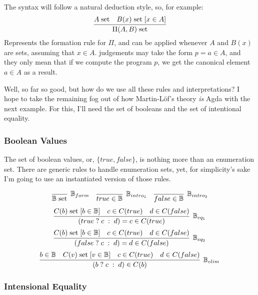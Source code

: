 \newcommand{\isset}[1]{#1 \; \text{set}}
\newcommand{\withhip}[2]{#2 \; [ #1 ] }
\newcommand{\BB}{\mathbb{B}}
\newcommand{\ite}[3]{(#1 \; ? \; #2 \; : \; #3)}
The syntax will follow a natural deduction style, so, for example: 
\[
  \infer{\isset{\Pi(A , B)}}{\isset{A} & \withhip{x \in A}{\isset{B(x)}}}
\]
Represents the formation rule for $\Pi$, and can be applied whenever $A$ and $B(x)$ are sets,
assuming that $x \in A$. judgements may take the form $p = a \in A$, and they only mean 
that if we compute the program $p$, we get the canonical element $a \in A$ as a result.

Well, so far so good, but how do we use all these rules and interpretations? I hope to take the
remaining fog out of how Martin-L\"{o}f's theory \emph{is} Agda with the next example. For this,
I'll need the set of booleans and the set of intentional equality.

\subsubsection{Boolean Values}

The set of boolean values, or, $\{ true, false \}$, is nothing more than an enumeration set.
There are generic rules to handle enumeration sets, yet, for simplicity's sake I'm going to use an instantiated
version of those rules.

\[ 
\begin{array}{c c c}
    \infer[\BB_{form}]{ \isset{\BB} }{} 
  & \infer[\BB_{intro_1}]{true \in \BB}{}
  & \infer[\BB_{intro_2}]{false \in \BB}{}
\end{array}
\]
\[
    \infer[\BB_{eq_1}]
          {\ite{true}{c}{d} = c \in C(true)}
          {\withhip{b \in \BB}{\isset{C(b)}}
          & c \in C(true)
          & d \in C(false)
          }
\] 
\vspace{2mm}
\[
    \infer[\BB_{eq_2}]
          {\ite{false}{c}{d} = d \in C(false)}
          {\withhip{b \in \BB}{\isset{C(b)}}
          & c \in C(true)
          & d \in C(false)
          }
\] 
\vspace{2mm}
\[
    \infer[\BB_{elim}]
          {\ite{b}{c}{d} \in C(b)}
          { b \in \BB
          & \withhip{v \in \BB}{\isset{C(v)}}
          & c \in C(true)
          & d \in C(false)
          }
\]
\vspace{2mm}

\subsubsection{Intensional Equality}

